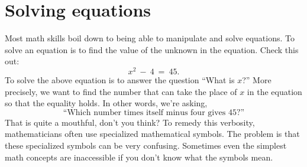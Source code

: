
\section{Solving equations}
\label{sec:solving_equations}

Most math skills boil down to being able to manipulate and solve equations.
To solve an equation is to find the value of the unknown in the equation.
Check this out:
\[
  x^2 \ - \ 4 \ = \ 45.
\]
To solve the above equation is to answer the question ``What is $x$?''
More precisely,
we want to find the number that can take the place of $x$ in the equation so that the equality holds.
In other words, we're asking,
\[
  \text{``Which number times itself minus four gives 45?''}
\]
That is quite a mouthful, don't you think?
To remedy this verbosity, mathematicians often use specialized mathematical symbols.
The problem is that these specialized symbols can be very confusing.
Sometimes even the simplest math concepts are inaccessible if you don't know what the symbols mean.
